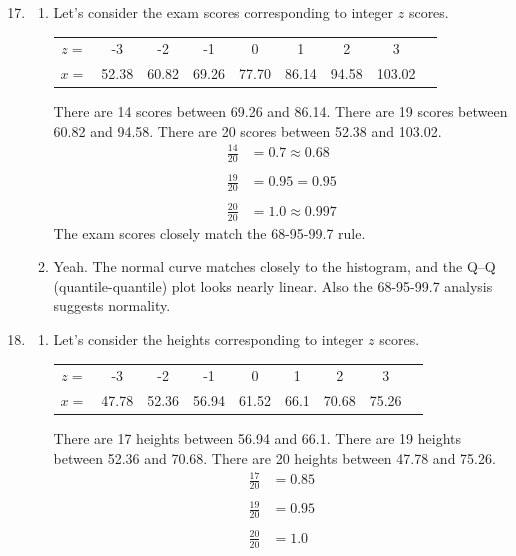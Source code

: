 \documentclass[12pt,letterpaper]{article}
\begin{document}
\newcommand{\N}[2]{\mathcal{N}\big(#1,~#2\big)}
\newcommand{\AND}{\textsc{~and~}}
\newcommand{\OR}{\textsc{~or~}}

\begin{enumerate}
\setcounter{enumi}{16}
\item \begin{enumerate}
\item Let's consider the exam scores corresponding to integer $z$ scores.
\begin{center}
\begin{tabular}{c c c c c c c c c}
$z = $ & -3 & -2 & -1 & 0 & 1 & 2 & 3 \\
$x = $ &52.38 & 60.82 & 69.26 & 77.70 & 86.14 & 94.58 & 103.02
\end{tabular}
\end{center}
There are 14 scores between 69.26 and 86.14. There are 19 scores between 60.82 and 94.58. There are 20 scores between 52.38 and 103.02.
\begin{align*}
\frac{14}{20} &= 0.7 \approx 0.68 \\\\
\frac{19}{20} &= 0.95 = 0.95\\\\
\frac{20}{20} &= 1.0 \approx 0.997
\end{align*}
The exam scores closely match the 68-95-99.7 rule.

\item Yeah. The normal curve matches closely to the histogram, and the Q–Q (quantile-quantile) plot looks nearly linear. Also the 68-95-99.7 analysis suggests normality.
\end{enumerate}

\item \begin{enumerate}
\item Let's consider the heights corresponding to integer $z$ scores.
\begin{center}
\begin{tabular}{c c c c c c c c c}
$z = $ & -3 & -2 & -1 & 0 & 1 & 2 & 3 \\
$x = $ & 47.78 & 52.36 & 56.94 & 61.52 & 66.1 & 70.68 & 75.26
\end{tabular}
\end{center}
There are 17 heights between 56.94 and 66.1. There are 19 heights between 52.36 and 70.68. There are 20 heights between 47.78 and 75.26.
\begin{align*}
\frac{17}{20} &= 0.85 \\\\
\frac{19}{20} &= 0.95\\\\
\frac{20}{20} &= 1.0
\end{align*}


\end{enumerate}
\end{enumerate}
\end{document}
